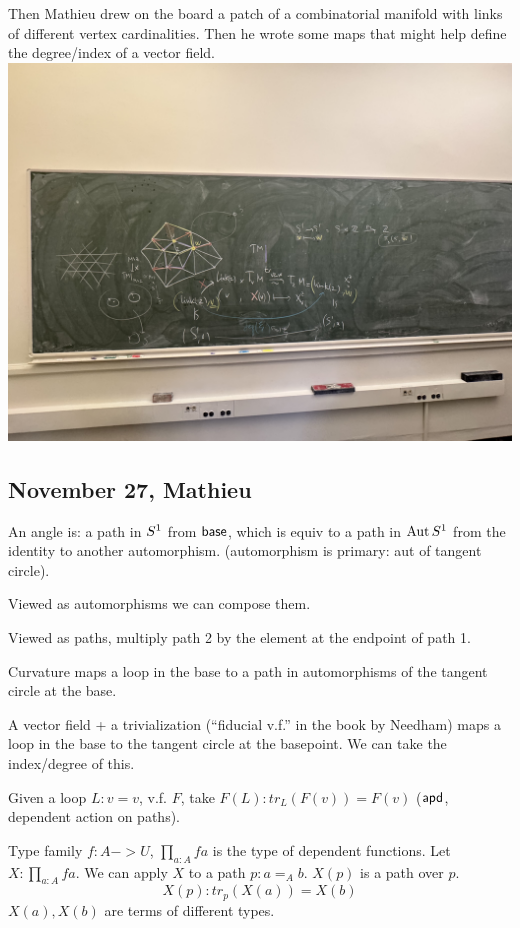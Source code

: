 \documentclass[12pt,fleqn]{article}
\begin{document}
Then Mathieu drew on the board a patch of a combinatorial manifold with links of different vertex cardinalities. Then he wrote some maps that might help define the degree/index of a vector field.
\includegraphics[width=400pt]{board2024.jpg}

\subsection{November 27, Mathieu}

An angle is: a path in \( S^1 \) from \( \mathsf{base} \), which is equiv to a path in \( \operatorname{Aut}S^1 \) from the identity to another automorphism. (automorphism is primary: aut of tangent circle).

Viewed as automorphisms we can compose them.

Viewed as paths, multiply path 2 by the element at the endpoint of path 1.

Curvature maps a loop in the base to a path in automorphisms of the tangent circle at the base.

A vector field + a trivialization (``fiducial v.f.'' in the book by Needham) maps a loop in the base to the tangent circle at the basepoint. We can take the index/degree of this.

Given a loop \( L:v=v \), v.f. \( F \), take \( F(L):tr_L(F(v))=F(v) \) (\( \mathsf{apd} \), dependent action on paths).

Type family \( f:A->U \), \( \prod_{a:A}fa \) is the type of dependent functions. Let \( X:\prod_{a:A}fa \). We can apply \( X \) to a path \( p:a=_A b \). \( X(p) \) is a path over \( p \).
\[ 
X(p):tr_p(X(a))=X(b) 
\]
\( X(a), X(b) \) are terms of different types.
\end{document}
